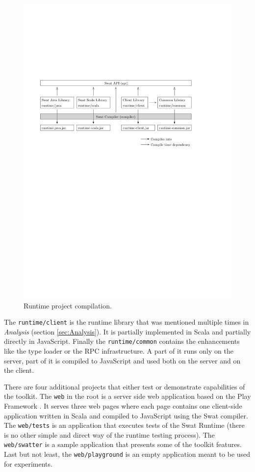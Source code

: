 \documentclass[12pt,a4paper]{report}
\begin{document}
\begin{figure}[ht]
  \centering
	\includegraphics[width=\linewidth,height=\textheight,keepaspectratio]{img/RuntimeCompilation.pdf}
	\caption{Runtime project compilation.}
	\label{RuntimeCompilation}
\end{figure}

The \texttt{runtime/client} is the runtime library that was mentioned multiple times in {\it Analysis} (section \ref{sec:Analysis}). It is partially implemented in Scala and partially directly in JavaScript. Finally the \texttt{runtime/common} contains the enhancements like the type loader or the RPC infrastructure. A part of it runs only on the server, part of it is compiled to JavaScript and used both on the server and on the client.

There are four additional projects that either test or demonstrate capabilities of the toolkit. The \texttt{web} in the root is a server side web application based on the Play Framework \cite{Play}. It serves three web pages where each page contains one client-side application written in Scala and compiled to JavaScript using the Swat compiler. The \texttt{web/tests} is an application that executes tests of the Swat Runtime (there is no other simple and direct way of the runtime testing process). The \texttt{web/swatter} is a sample application that presents some of the toolkit features. Last but not least, the \texttt{web/playground} is an empty application meant to be used for experiments.
\end{document}
